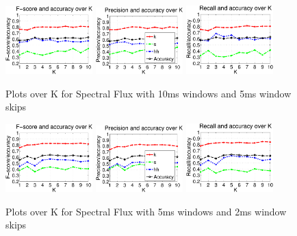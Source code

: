 		\begin{figure}
		
		
			\centering\includegraphics[width=0.3\textwidth]{tex/appendices/test/sflux105FP.png}
			\centering\includegraphics[width=0.3\textwidth]{tex/appendices/test/sflux105_P.png}
			\centering\includegraphics[width=0.3\textwidth]{tex/appendices/test/sflux105_R.png}
				
				\caption{Plots over K for Spectral Flux with 10ms windows and 5ms window skips}
		\end{figure}
		\begin{figure}
		
		
			\centering\includegraphics[width=0.3\textwidth]{tex/appendices/test/sflux52FP.png}
			\centering\includegraphics[width=0.3\textwidth]{tex/appendices/test/sflux52_P.png}
			\centering\includegraphics[width=0.3\textwidth]{tex/appendices/test/sflux52_R.png}
				
				\caption{Plots over K for Spectral Flux with 5ms windows and 2ms window skips}
		\end{figure}
		


